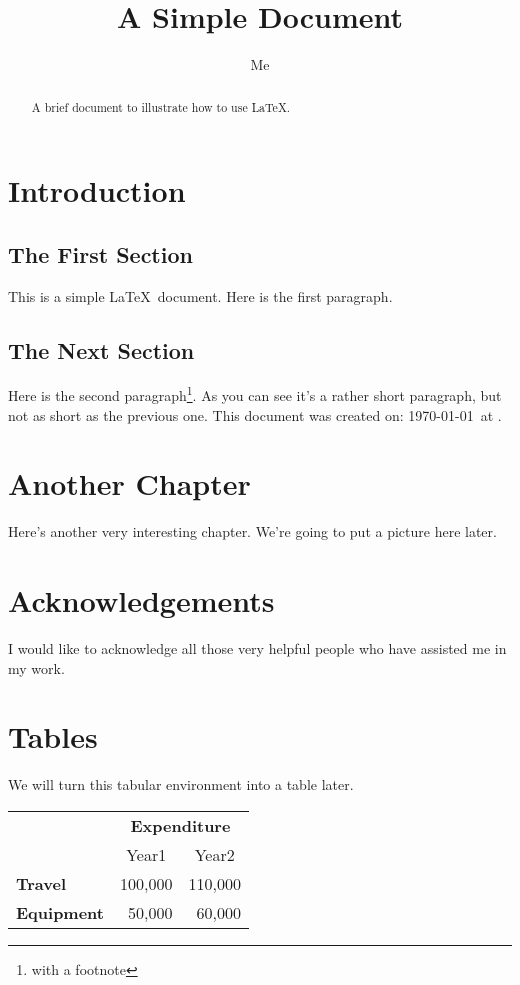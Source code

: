 \documentclass[12pt]{scrreprt}
\title{A Simple Document}
\author{Me}
\begin{document}
\maketitle

\tableofcontents

\begin{abstract}
A brief document to
illustrate how to use \LaTeX.
\end{abstract}

\chapter{Introduction}

\section{The First Section}

This is a simple \LaTeX\ document.
Here is the first paragraph.

\section{The Next Section}

Here is the second paragraph\footnote{with a footnote}. 
As you can see it's a rather short paragraph, but not 
as short as the previous one. This document was 
created on: \today\ at \currenttime.

\chapter{Another Chapter}

Here's another very interesting chapter.
We're going to put a picture here later.

\chapter*{Acknowledgements}

I would like to acknowledge all those
very helpful people who have assisted
me in my work.

\appendix
\chapter{Tables}

We will turn this tabular environment into a table later.

\begin{tabular}{lrr}
 & \multicolumn{2}{c}{\bfseries Expenditure}\\
 & \multicolumn{1}{c}{Year1} & \multicolumn{1}{c}{Year2}\\
\bfseries Travel & 100,000 & 110,000\\
\bfseries Equipment & 50,000 & 60,000
\end{tabular}
\end{document}
